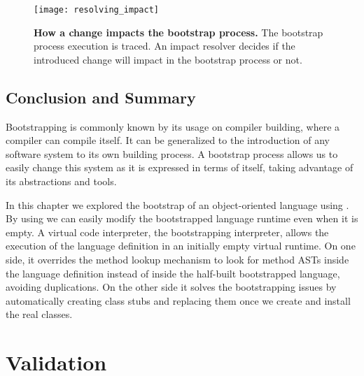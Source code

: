 \begin{figure}[ht]
\center
\texttt{[image: resolving\_impact]}
\caption{\textbf{How a change impacts the bootstrap process.} The bootstrap process execution is traced. An impact resolver decides if the introduced change will impact in the bootstrap process or not.\label{fig:resolving_impact}}
\end{figure}

\section{Conclusion and Summary}

Bootstrapping is commonly known by its usage on compiler building, where a compiler can compile itself.
It can be generalized to the introduction of any software system to its own building process.
A bootstrap process allows us to easily change this system as it is expressed in terms of itself, taking advantage of its abstractions and tools.

In this chapter we explored the bootstrap of an object-oriented language using \Vtt. By using \Vtt we can easily modify the bootstrapped language runtime even when it is empty. A virtual code interpreter, the bootstrapping interpreter, allows the execution of the language definition in an initially empty virtual runtime. On one side, it overrides the method lookup mechanism to look for method ASTs inside the language definition instead of inside the half-built bootstrapped language, avoiding duplications. On the other side it solves the bootstrapping issues by automatically creating class stubs and replacing them once we create and install the real classes.
%

\chapter{Validation} \label{sec:bootstrapping_validation}
\introduction

